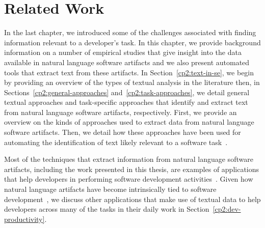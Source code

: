 \setcounter{chapter}{1}


\chapter{Related Work}
\label{ch:related-work}




In the last chapter, we introduced some of the challenges
associated with finding
information relevant to a developer's task.
In this chapter, we provide background information on 
a number of empirical studies that give insight into
the data available in natural language software artifacts 
and we also present 
automated tools that extract text from these artifacts.
In Section~\ref{cp2:text-in-se}, we begin by providing an  
overview of the types of textual analysis in the literature
then, in Sections~\ref{cp2:general-approaches}
and~\ref{cp2:task-approaches}, we
detail general textual approaches 
and task-specific approaches
that identify and extract text from natural language software artifacts, respectively.
First, we provide an overview on the kinds of approaches 
used to extract data from natural language software artifacts.
Then, we detail how these approaches 
have been used for automating the identification of text 
likely relevant to a software task~\cite{a}.






Most of the techniques that extract information from natural language software artifacts, including the work presented in this thesis, 
are examples of applications that help developers in performing 
software development activities~\cite{Meyer2017}. 
Given how 
natural language artifacts have become intrinsically
tied to software development~\cite{umarji2008archetypal},
we discuss
other applications that make use of textual data
to help developers
across many of the tasks in their daily work in Section~\ref{cp2:dev-productivity}.




% 
% 








